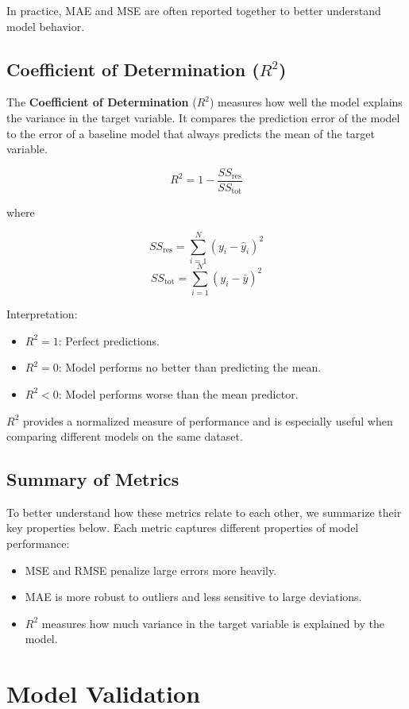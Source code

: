 \documentclass{article}
\begin{document}
In practice, MAE and MSE are often reported together to better understand model behavior.

\subsection{Coefficient of Determination ($R^2$)}

The \textbf{Coefficient of Determination} ($R^2$) measures how well the model explains the variance in the target variable.  
It compares the prediction error of the model to the error of a baseline model that always predicts the mean of the target variable.

\[
R^2 = 1 - \frac{SS_{\text{res}}}{SS_{\text{tot}}}
\]

where

\[
SS_{\text{res}}=\sum_{i=1}^{N}(y_i-\hat{y}_i)^2
\]
\[
SS_{\text{tot}}=\sum_{i=1}^{N}(y_i-\bar{y})^2
\]

Interpretation:

\begin{itemize}
\item \textbf{$R^2 = 1$}: Perfect predictions.
\item \textbf{$R^2 = 0$}: Model performs no better than predicting the mean.
\item \textbf{$R^2 < 0$}: Model performs worse than the mean predictor.
\end{itemize}

$R^2$ provides a normalized measure of performance and is especially useful when comparing different models on the same dataset.


\subsection{Summary of Metrics}

To better understand how these metrics relate to each other, we summarize their key properties below. Each metric captures different properties of model performance:
\begin{itemize}
\item MSE and RMSE penalize large errors more heavily.
\item MAE is more robust to outliers and less sensitive to large deviations.
\item $R^2$ measures how much variance in the target variable is explained by the model.
\end{itemize}


\section{Model Validation}
\end{document}
